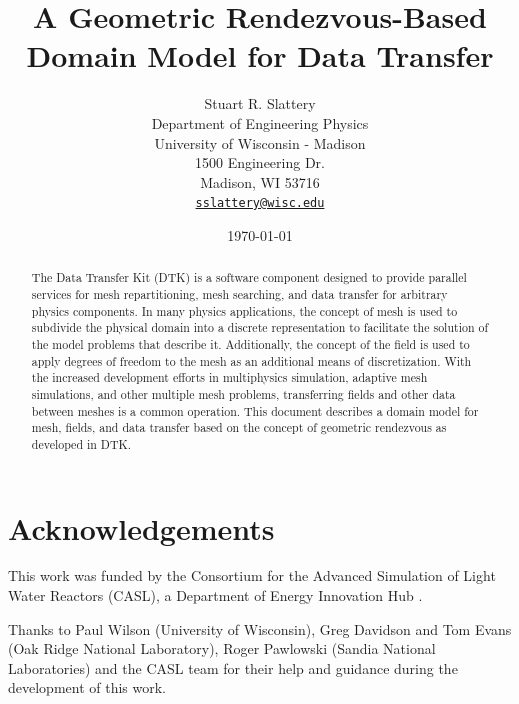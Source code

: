 \documentclass[letterpaper,12pt]{article}
\author{
  Stuart R. Slattery\\
  Department of Engineering Physics\\
  University of Wisconsin - Madison\\
  1500 Engineering Dr.\\
  Madison, WI 53716\\
  \href{mailto:sslattery@wisc.edu}{\texttt{sslattery@wisc.edu}}
}
\date{\today}
\title{A Geometric Rendezvous-Based Domain Model for Data Transfer}
\begin{document}
\maketitle

\newpage

\begin{abstract}
  The Data Transfer Kit (DTK) is a software component designed to
  provide parallel services for mesh repartitioning, mesh searching,
  and data transfer for arbitrary physics components. In many physics
  applications, the concept of mesh is used to subdivide the physical
  domain into a discrete representation to facilitate the solution of
  the model problems that describe it. Additionally, the concept of
  the field is used to apply degrees of freedom to the mesh as an
  additional means of discretization. With the increased development
  efforts in multiphysics simulation, adaptive mesh simulations, and
  other multiple mesh problems, transferring fields and other data
  between meshes is a common operation. This document describes a
  domain model for mesh, fields, and data transfer based on the
  concept of geometric rendezvous as developed in DTK.
\end{abstract}

\newpage

\section*{Acknowledgements}
This work was funded by the Consortium for the Advanced Simulation of
Light Water Reactors (CASL), a Department of Energy Innovation Hub
\cite{CASL_web}.

Thanks to Paul Wilson (University of Wisconsin), Greg Davidson and Tom
Evans (Oak Ridge National Laboratory), Roger Pawlowski (Sandia
National Laboratories) and the CASL team for their help and guidance
during the development of this work.

\newpage

\tableofcontents
\clearpage
\listoffigures
\clearpage
\newpage

\end{document}
